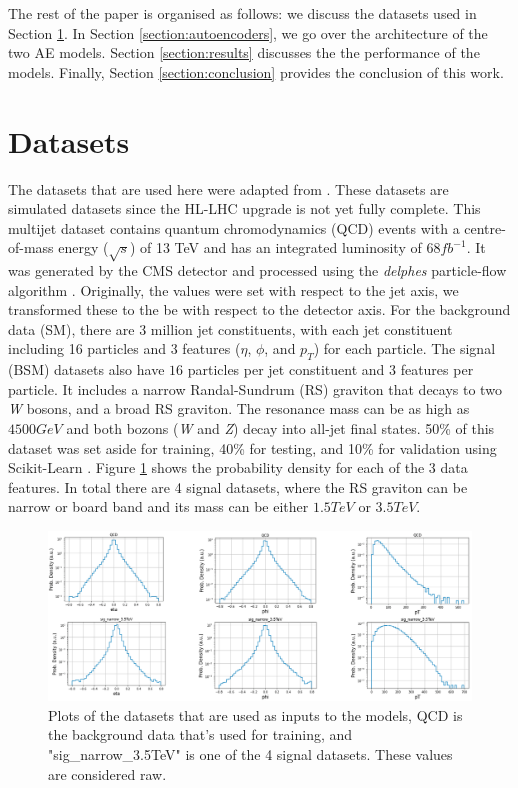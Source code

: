 \documentclass[a4paper]{article}
\theoremstyle{plain}
\theoremstyle{definition}
\begin{document}
    The rest of the paper is organised as follows: we discuss the datasets used in Section \ref{section:datasets}. In Section \ref{section:autoencoders}, we go over the architecture of the two AE models. Section \ref{section:results} discusses the the performance of the models. Finally, Section \ref{section:conclusion} provides the conclusion of this work.
    
    \section{Datasets}
    \label{section:datasets}

    The datasets that are used here were adapted from \cite{data}. These datasets are simulated datasets since the HL-LHC upgrade is not yet fully complete. This multijet dataset contains quantum chromodynamics (QCD) events with a centre-of-mass energy ($\sqrt{s}$) of 13 TeV and has an integrated luminosity of $68 fb^{-1}$. It was generated by the CMS detector and processed using the \textit{delphes} particle-flow algorithm \cite{delphes}. Originally, the values were set with respect to the jet axis, we transformed these to the be with respect to the detector axis. For the background data (SM), there are 3 million jet constituents, with each jet constituent including 16 particles and 3 features ($\eta$, $\phi$, and $p_T$) for each particle. The signal (BSM) datasets also have $16$ particles per jet constituent and 3 features per particle. It includes a narrow Randal-Sundrum (RS) graviton \cite{graviton} that decays to two \textit{W} bosons, and a broad RS graviton. The resonance mass can be as high as $4500 GeV$ and both bozons (\textit{W} and \textit{Z}) decay into all-jet final states. 50\% of this dataset was set aside for training, 40\% for testing, and 10\% for validation using Scikit-Learn \cite{scikit-learn}. Figure \ref{fig:data} shows the probability density for each of the 3 data features. In total there are 4 signal datasets, where the RS graviton can be narrow or board band and its mass can be either $1.5 TeV$ or $3.5 TeV$. 

    \begin{figure}[H]
        \centering
        \begin{minipage}[b]{\linewidth}
            \centering
            \includegraphics[width=\textwidth]{data.png}
            \caption{Plots of the datasets that are used as inputs to the models, QCD is the background data that's used for training, and "sig\_narrow\_3.5TeV" is one of the 4 signal datasets. These values are considered raw.}
            \label{fig:data}
        \end{minipage}
    \end{figure}
    
\end{document}
